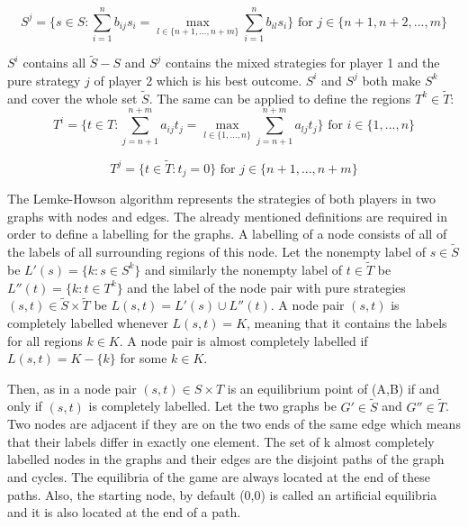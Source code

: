 \[
S^j = \{ s \in S: \sum_{i=1}^{n} b_{ij} s_i = \max_{l \in \{n+1,...,n+m\}} \sum_{i=1}^{n} b_{il} s_i \} \text{ for } j \in \{n+1,n+2,...,m\}
\]

$S^i$ contains all $\tilde{S}-S$ and $S^j$ contains the mixed strategies for player 1 and the pure strategy $j$ of player 2 which is his best outcome. $S^i$ and $S^j$ both make $S^k$ and cover the whole set $\tilde{S}$. The same can be applied to define the regions $T^k \in \tilde{T}$:
\[ 
T^i = \{ t \in T: \sum_{j=n+1}^{n+m} a_{ij} t_j = \max_{l \in \{1,...,n\}} \sum_{j=n+1}^{n+m} a_{lj} t_j \} \text{ for } i \in \{1,...,n\} 
\]

\[
T^j = \{ t \in \tilde{T}: t_j = 0 \} \text{ for } j \in \{n+1,...,n+m\} 
\]

The Lemke-Howson algorithm represents the strategies of both players in two graphs with nodes and edges. The already mentioned definitions are required in order to define a labelling for the graphs. A labelling of a node consists of all of the labels of all surrounding regions of this node. Let the nonempty label of $s \in \tilde{S}$ be $L'(s) = \{ k: s \in S^k \}$ and similarly the nonempty label of $t \in \tilde{T}$ be $L''(t) = \{ k: t \in T^k \}$ and the label of the node pair with pure strategies $(s,t) \in \tilde{S} \times \tilde{T}$ be $L(s,t) = L'(s) \cup L''(t)$. A node pair $(s,t)$ is completely labelled whenever $L(s,t) = K$, meaning that it contains the labels for all regions $k \in K$. A node pair is almost completely labelled if $L(s,t) = K - \{k\}$ for some $k \in K$. 

Then, as in \citet{shapley1974note} a node pair $(s,t) \in S \times T$ is an equilibrium point of (A,B) if and only if $(s,t)$ is completely labelled. Let the two graphs be $G' \in \tilde{S}$ and $G'' \in \tilde{T}$. Two nodes are adjacent if they are on the two ends of the same edge which means that their labels differ in exactly one element. The set of k almost completely labelled nodes in the graphs and their edges are the disjoint paths of the graph and cycles. The equilibria of the game are always located at the end of these paths. Also, the starting node, by default (0,0) is called an artificial equilibria and it is also located at the end of a path.

